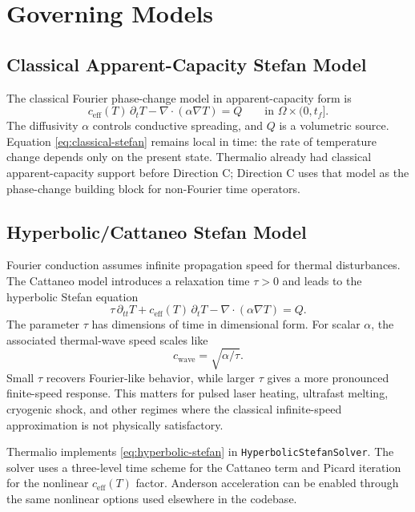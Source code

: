 \documentclass[11pt]{article}
\numberwithin{equation}{section}
\begin{document}
\section{Governing Models}

\subsection{Classical Apparent-Capacity Stefan Model}

The classical Fourier phase-change model in apparent-capacity form is
\begin{equation}
  c_{\mathrm{eff}}(T)\,\partial_t T
  - \nabla\cdot(\alpha\nabla T) = Q
  \qquad \text{in } \Omega\times(0,t_f].
  \label{eq:classical-stefan}
\end{equation}
The diffusivity $\alpha$ controls conductive spreading, and $Q$ is a volumetric
source.  Equation \eqref{eq:classical-stefan} remains local in time: the rate of
temperature change depends only on the present state.  Thermalio already had
classical apparent-capacity support before Direction C; Direction C uses that
model as the phase-change building block for non-Fourier time operators.

\subsection{Hyperbolic/Cattaneo Stefan Model}

Fourier conduction assumes infinite propagation speed for thermal disturbances.
The Cattaneo model introduces a relaxation time $\tau>0$ and leads to the
hyperbolic Stefan equation
\begin{equation}
  \tau\,\partial_{tt} T
  + c_{\mathrm{eff}}(T)\,\partial_t T
  - \nabla\cdot(\alpha\nabla T) = Q.
  \label{eq:hyperbolic-stefan}
\end{equation}
The parameter $\tau$ has dimensions of time in dimensional form.  For scalar
$\alpha$, the associated thermal-wave speed scales like
\begin{equation}
  c_{\mathrm{wave}} = \sqrt{\alpha/\tau}.
  \label{eq:wave-speed}
\end{equation}
Small $\tau$ recovers Fourier-like behavior, while larger $\tau$ gives a more
pronounced finite-speed response.  This matters for pulsed laser heating,
ultrafast melting, cryogenic shock, and other regimes where the classical
infinite-speed approximation is not physically satisfactory.

Thermalio implements \eqref{eq:hyperbolic-stefan} in
\texttt{HyperbolicStefanSolver}.  The solver uses a three-level time scheme for
the Cattaneo term and Picard iteration for the nonlinear
$c_{\mathrm{eff}}(T)$ factor.  Anderson acceleration can be enabled through the
same nonlinear options used elsewhere in the codebase.
\end{document}

